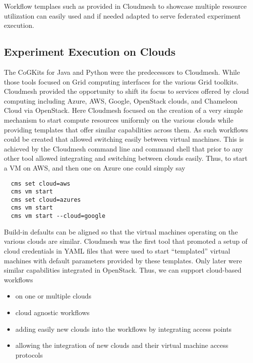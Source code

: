 Workflow templaes such as provided in Cloudmesh to showcase multiple resource utilization can easily used and if needed adapted to serve federated experiment execution. 

\subsection{Experiment Execution on Clouds}

The CoGKits for Java and Python were the predecessors to Cloudmesh. While those tools focused on Grid computing interfaces for the various Grid toolkits. Cloudmesh provided the opportunity to shift its focus to services offered by cloud computing including Azure, AWS, Google, OpenStack clouds, and Chameleon Cloud via OpenStack. Here Cloudmesh focused on the creation of a very simple mechanism to start compute resources uniformly on the various clouds while providing templates that offer similar capabilities across them. As such workflows could be created that allowed switching easily between virtual machines. This is achieved by the Cloudmesh command line and command shell that prior to any other tool allowed integrating and switching between clouds easily. Thus, to start a VM on AWS, and then one on Azure one could simply say

\begin{verbatim}
  cms set cloud=aws
  cms vm start
  cms set cloud=azures
  cms vm start
  cms vm start --cloud=google
\end{verbatim}

Build-in defaults can be aligned so that the virtual machines operating on the various clouds are similar.
Cloudmesh was the first tool that promoted a setup of cloud credentials in YAML files that were used to start ``templated'' virtual machines with default parameters provided by these templates. Only later were similar capabilities integrated in OpenStack. Thus, we can support cloud-based workflows

\begin{itemize}
    \item on one or multiple clouds
    \item cloud agnostic workflows
    \item adding easily new clouds into the workflows by integrating access points
    \item allowing the integration of new clouds and their virtual machine access protocols
\end{itemize}

